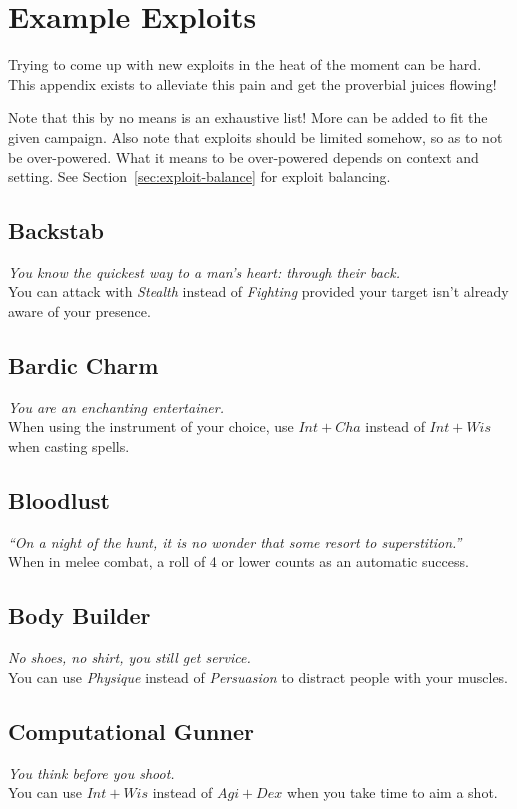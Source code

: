 \chapter{Example Exploits}\label{app:exploits}
Trying to come up with new exploits in the heat of the moment can be hard.
This appendix exists to alleviate this pain and get the proverbial juices flowing!

Note that this by no means is an exhaustive list!
More can be added to fit the given campaign.
Also note that exploits should be limited somehow, so as to not be over-powered. What it means to be over-powered depends on context and setting. See Section~\ref{sec:exploit-balance} for exploit balancing.

\section{Backstab}
\textit{You know the quickest way to a man's heart: through their back.}\\
You can attack with \textit{Stealth} instead of \textit{Fighting} provided your target isn't already aware of your presence.

\section{Bardic Charm}
\textit{You are an enchanting entertainer.}\\
When using the instrument of your choice, use $Int+Cha$ instead of $Int+Wis$ when casting spells.

\section{Bloodlust}
\textit{``On a night of the hunt, it is no wonder that some resort to superstition.''}\\
When in melee combat, a roll of 4 or lower counts as an automatic success.

\section{Body Builder}
\textit{No shoes, no shirt, you still get service.}\\
You can use \textit{Physique} instead of \textit{Persuasion} to distract people with your muscles.

\section{Computational Gunner}
\textit{You think before you shoot.}\\
You can use $Int+Wis$ instead of $Agi+Dex$ when you take time to aim a shot.

